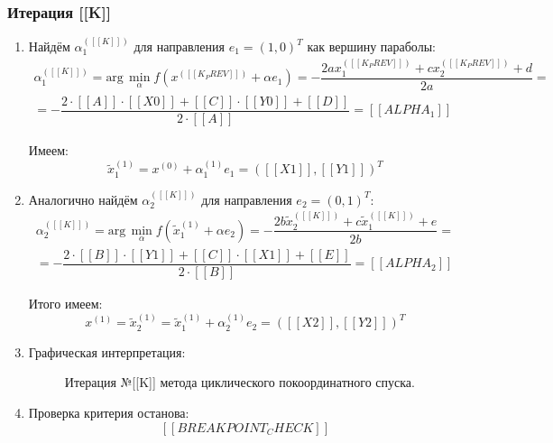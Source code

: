 \subsubsection{Итерация [[K]]}

\begin{enumerate}
  \item Найдём $\alpha^{([[K]])}_1$ для направления $e_1=(1,0)^T$ как вершину параболы:
  \[
  \begin{gathered}
    \alpha^{([[K]])}_1=\textrm{arg}\,\min_{\alpha}f(x^{([[K_PREV]])}+\alpha e_1)=-\dfrac{2ax^{([[K_PREV]])}_1+cx^{([[K_PREV]])}_2+d}{2a}=\\
    =-\dfrac{2\cdot [[A]]\cdot [[X0]]+[[C]]\cdot [[Y0]]+[[D]]}{2\cdot [[A]]}=[[ALPHA_1]]
  \end{gathered}
  \]

  Имеем:
  \[
    \tilde{x}_1^{(1)}=x^{(0)}+\alpha_1^{(1)}e_1=([[X1]],[[Y1]])^T
  \]

  \item Аналогично найдём $\alpha^{([[K]])}_2$ для направления $e_2=(0,1)^T$:
  \[
  \begin{gathered}
    \alpha^{([[K]])}_2=\textrm{arg}\,\min_{\alpha}f(\tilde{x}^{(1)}_1+\alpha e_2)=-\dfrac{2b\tilde{x}^{([[K]])}_2+c\tilde{x}^{([[K]])}_1+e}{2b}=\\
    =-\dfrac{2\cdot [[B]]\cdot [[Y1]]+[[C]]\cdot [[X1]]+[[E]]}{2\cdot [[B]]}=[[ALPHA_2]]
  \end{gathered}
  \]

  Итого имеем:
  \[
    x^{(1)}=\tilde{x}_2^{(1)}=\tilde{x}^{(1)}_1+\alpha_2^{(1)}e_2=([[X2]],[[Y2]])^T
  \]

  \item Графическая интерпретация:
  \begin{figure}[H]
  \centering
  \caption{Итерация №[[K]] метода циклического покоординатного спуска.}
  \end{figure}

  \item Проверка критерия останова:
  \[
    [[BREAKPOINT_CHECK]]
  \]
\end{enumerate}